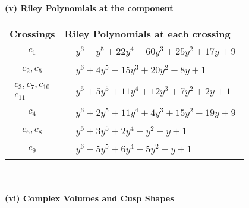 \documentclass[1p]{elsarticle_modified}
\theoremstyle{definition}
\begin{document}
\newpage\renewcommand{\arraystretch}{1}
\flushleft \textbf{(v) Riley Polynomials at the component}\newline \\
\begin{tabular}{m{50pt}|m{274pt}}
Crossings & \hspace{64pt}Riley Polynomials at each crossing \\
\hline $$\begin{aligned}c_{1}\end{aligned}$$&$\begin{aligned}
&y^6- y^5+22 y^4-60 y^3+25 y^2+17 y+9
\end{aligned}$\\
\hline $$\begin{aligned}c_{2},c_{5}\end{aligned}$$&$\begin{aligned}
&y^6+4 y^5-15 y^3+20 y^2-8 y+1
\end{aligned}$\\
\hline $$\begin{aligned}c_{3},c_{7},c_{10}\\c_{11}\end{aligned}$$&$\begin{aligned}
&y^6+5 y^5+11 y^4+12 y^3+7 y^2+2 y+1
\end{aligned}$\\
\hline $$\begin{aligned}c_{4}\end{aligned}$$&$\begin{aligned}
&y^6+2 y^5+11 y^4+4 y^3+15 y^2-19 y+9
\end{aligned}$\\
\hline $$\begin{aligned}c_{6},c_{8}\end{aligned}$$&$\begin{aligned}
&y^6+3 y^5+2 y^4+y^2+y+1
\end{aligned}$\\
\hline $$\begin{aligned}c_{9}\end{aligned}$$&$\begin{aligned}
&y^6-5 y^5+6 y^4+5 y^2+y+1
\end{aligned}$\\
\hline
\end{tabular}\\~\\
\newpage\flushleft \textbf{(vi) Complex Volumes and Cusp Shapes}
\end{document}
